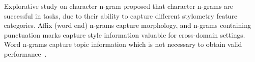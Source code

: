 

Explorative study on character n-gram proposed that character n-grams are successful in \ai{} tasks, due to their ability to capture different stylometry feature categories.
Affix (word end) n-grams capture morphology, and n-grams containing punctuation marks capture style information valuable for cross-domain settings.
Word n-grams capture topic information which is not necessary to obtain valid performance~\citep{Sapkota_ngrams_2015}.





